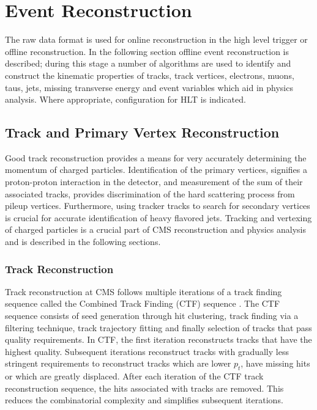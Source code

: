 \chapter{Event Reconstruction}
\label{chapter:EventReco}
The raw data format 
is used for online reconstruction in the high level trigger
or offline reconstruction. 
In the following section offline event reconstruction is described;
during this stage a number of algorithms are used to identify and
construct the kinematic properties 
of tracks, track vertices,  electrons, muons, taus, jets, missing transverse energy and 
event variables which aid in physics analysis. Where appropriate, configuration
for HLT is indicated. 
\section{Track and Primary Vertex Reconstruction}
Good track reconstruction provides a means for very accurately determining
the momentum of charged particles.
Identification of the primary vertices, signifies a proton-proton interaction in the detector, and 
measurement of the sum of their associated tracks, 
provides discrimination of the hard scattering process 
from pileup vertices.
Furthermore, using tracker tracks to search for secondary vertices
is crucial for accurate identification of heavy flavored jets.
Tracking and vertexing of charged particles is a crucial part of CMS reconstruction
and physics analysis and is described in the following sections.
\subsection{Track Reconstruction}
\label{sec:TrackReco}
Track reconstruction at CMS follows multiple iterations of a track finding sequence
called the Combined Track Finding (CTF) sequence \cite{CMSTDRPhysics}. 
The CTF sequence consists of seed generation through hit clustering,
track finding via a filtering technique, track trajectory fitting and finally
selection of tracks that pass quality requirements. 
In CTF, the first iteration reconstructs tracks that
have the highest quality. Subsequent iterations reconstruct
tracks with gradually less stringent requirements 
to reconstruct tracks which are lower $p_{t}$, have missing hits or which are greatly displaced.
After each iteration of the CTF track reconstruction sequence, the hits
associated with tracks are removed. This reduces the combinatorial complexity
and simplifies subsequent iterations.%

